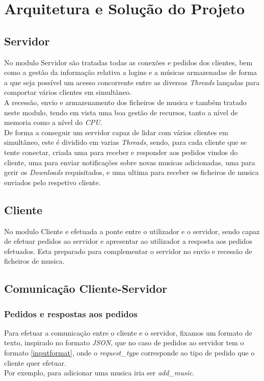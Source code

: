 \documentclass[a4paper]{report}
\begin{document}
\chapter{Arquitetura e Solução do Projeto}
\section{Servidor}
No modulo Servidor são tratadas todas as conexões e pedidos dos clientes, bem
como a gestão da informação relativa a logins e a músicas armazenadas de 
forma a que seja possível um acesso concorrente entre as diversas 
\textit{Threads} lançadas para comportar vários clientes em simultâneo.\\
A recessão, envio e armazenamento dos ficheiros de musica e também tratado neste
modulo, tendo em vista uma boa gestão de recursos, tanto a nível de memoria
como a nível do \textit{CPU}.\\
De forma a conseguir um servidor capaz de lidar com vários clientes em
simultâneo, este é dividido em varias \textit{Threads}, sendo, para cada
cliente que se tente conectar, criada uma para receber e responder aos
pedidos vindos do cliente, uma para enviar notificações sobre novas musicas
adicionadas, uma para gerir os \textit{Downloads} requisitados, e uma ultima
para receber os ficheiros de musica enviados pelo respetivo cliente.

\section{Cliente}
No modulo Cliente e efetuada a ponte entre o utilizador e o servidor, sendo 
capaz de efetuar pedidos ao servidor e apresentar ao utilizador a resposta aos
pedidos efetuados. Esta preparado para complementar o servidor no envio e
recessão de ficheiros de musica.

\section{Comunicação Cliente-Servidor}
\subsection{Pedidos e respostas aos pedidos}
Para efetuar a comunicação entre o cliente e o servidor, fixamos
um formato de texto, inspirado no formato \textit{JSON}, que no caso
de pedidos ao servidor tem o formato \ref{inputformat}, onde o 
\textit{request\_type} corresponde ao tipo de pedido que o cliente quer
efetuar.\\
Por exemplo, para adicionar uma musica iria ser \textit{add\_music}.\\
\end{document}
